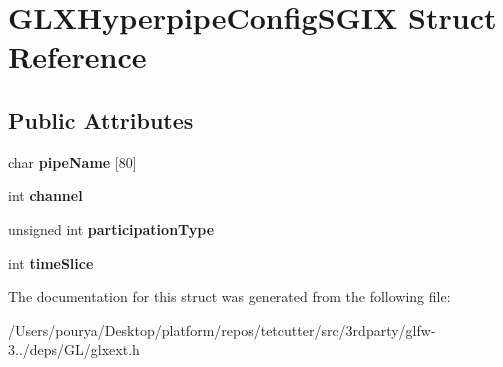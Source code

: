 \hypertarget{structGLXHyperpipeConfigSGIX}{}\section{G\+L\+X\+Hyperpipe\+Config\+S\+G\+I\+X Struct Reference}
\label{structGLXHyperpipeConfigSGIX}
\subsection*{Public Attributes}
\begin{DoxyCompactItemize}
\item 
\hypertarget{structGLXHyperpipeConfigSGIX_adbbd59b9e05c106f38f6fe769653be86}{}char {\bfseries pipe\+Name} \mbox{[}80\mbox{]}\label{structGLXHyperpipeConfigSGIX_adbbd59b9e05c106f38f6fe769653be86}

\item 
\hypertarget{structGLXHyperpipeConfigSGIX_abc812d8796ba89d5de4e33b3532d8335}{}int {\bfseries channel}\label{structGLXHyperpipeConfigSGIX_abc812d8796ba89d5de4e33b3532d8335}

\item 
\hypertarget{structGLXHyperpipeConfigSGIX_a093cfaaec305531f66e1120929b5b01b}{}unsigned int {\bfseries participation\+Type}\label{structGLXHyperpipeConfigSGIX_a093cfaaec305531f66e1120929b5b01b}

\item 
\hypertarget{structGLXHyperpipeConfigSGIX_afe9288e75dc1ae5e0f33eff978d7024d}{}int {\bfseries time\+Slice}\label{structGLXHyperpipeConfigSGIX_afe9288e75dc1ae5e0f33eff978d7024d}

\end{DoxyCompactItemize}


The documentation for this struct was generated from the following file\+:\begin{DoxyCompactItemize}
\item 
/\+Users/pourya/\+Desktop/platform/repos/tetcutter/src/3rdparty/glfw-\/3../deps/\+G\+L/glxext.\+h\end{DoxyCompactItemize}
